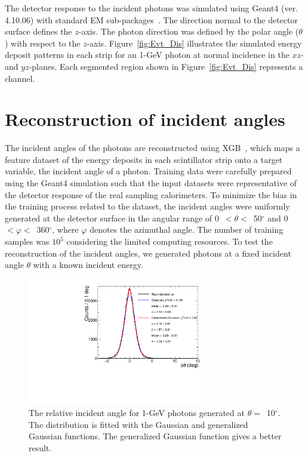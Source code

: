 \documentclass[preprint,12pt,times,a4paper]{elsarticle}
\begin{document}
The detector response to the incident photons was simulated using Geant4 (ver. 4.10.06) with standard EM sub-packages~\cite{GEANT4}. The direction normal to the detector surface defines the $z$-axis. The photon direction was defined by the polar angle ($\theta$) with respect to the $z$-axis. Figure~\ref{fig:Evt_Dis} illustrates the simulated energy deposit patterns in each strip for an 1-GeV photon at normal incidence in the $xz$- and $yz$-planes. Each segmented region shown in Figure~\ref{fig:Evt_Dis} represents a channel.

\section{Reconstruction of incident angles}
\label{sec:res}

The incident angles of the photons are reconstructed using XGB~\cite{xgboost:2016}, which maps a feature dataset of the energy deposits in each scintillator strip onto a target variable, the incident angle of a photon. Training data were carefully prepared using the Geant4 simulation such that the input datasets were representative of the detector response of the real sampling calorimeters. To minimize the bias in the training process related to the dataset, the incident angles were uniformly generated at the detector surface in the angular range of 0~$<\theta<$~50$^{\circ}$ and 0~$<\varphi<$~360$^{\circ}$, where $\varphi$ denotes the azimuthal angle. The number of training samples was $10^{5}$ considering the limited computing resources. To test the reconstruction of the incident angles, we generated photons at a fixed incident angle $\theta$ with a known incident energy.

\begin{figure}[!hbt]
\centering
\includegraphics[width=0.7\textwidth]{figures/Fig3_fit_GG.pdf}
\caption{ The relative incident angle for 1-GeV photons generated at $\theta=$~10$^{\circ}$. The distribution is fitted with the Gaussian and generalized Gaussian functions. The generalized Gaussian function gives a better result.}
\label{fig:angle_10degree}
\end{figure}
\end{document}
